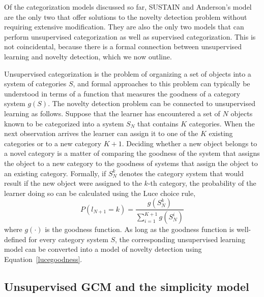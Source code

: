 \documentclass[doc]{apa6}
\begin{document}
Of the categorization models discussed so far, SUSTAIN and Anderson's model are the only two that offer solutions to the novelty detection problem without requiring extensive modification. They are also the only two models that can perform unsupervised categorization as well as supervised categorization. This is not coincidental, because there is a formal connection between unsupervised learning and novelty detection, which we now outline.

Unsupervised categorization is the problem of
organizing a set of objects into a system of categories $S$, and formal
approaches to this problem can typically be understood in terms of a
function that measures the goodness of a category system $g(S)$.
The novelty detection problem can be connected to unsupervised learning
as follows. Suppose that the learner has encountered a set of $N$
objects known to be categorized into a system $S_N$ that contains $K$
categories. When the next observation arrives the learner can assign
it to one of the $K$ existing categories or to a new category $K+1$.
Deciding whether a new object belongs to a novel category is a
matter of comparing the goodness of the system that assigns the object to
a new category to the goodness of systems that assign the object to an
existing category. Formally, if $S_N^k$ denotes the category system that
would result if the new object were assigned to the $k$-th category,
the probability of the learner doing so can be calculated using the
Luce choice rule,
\begin{equation}
P(l_{N+1} = k) = \frac{g(S_N^k)}{\sum\limits_{i=1}^{K+1} g(S_N^i)}
\label{lucegoodness}
\end{equation}
where $g(\cdot)$ is the goodness function. As long as the goodness function
is well-defined for every category system $S$, the corresponding unsupervised
learning model can be converted into a model of novelty detection using
Equation~\ref{lucegoodness}.

\subsection{Unsupervised GCM and the simplicity model}
\end{document}
